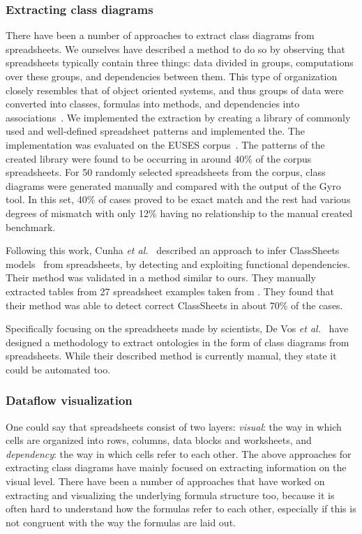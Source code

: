 \documentclass[conference]{IEEEtran}
\begin{document}
\subsubsection{Extracting class diagrams}
There have been a number of approaches to extract class diagrams from spreadsheets. We ourselves have described a method to do so by observing that spreadsheets typically contain three things: data divided in groups, computations over these groups, and dependencies between them. This type of organization closely resembles that of object oriented systems, and thus groups of data were converted into classes, formulas into methods, and dependencies into associations~\cite{hermans_automatically_2010}. We implemented the extraction by creating a library of commonly used and well-defined spreadsheet patterns and implemented the. The implementation was evaluated on the EUSES corpus~\cite{fisher_euses_2005}. The patterns of the created library were found to be occurring in around 40\% of the corpus spreadsheets. For 50 randomly selected spreadsheets from the corpus, class diagrams were generated manually and compared with the output of the Gyro tool. In this set, 40\% of cases proved to be exact match and the rest had various degrees of mismatch with only 12\% having no relationship to the manual created benchmark.

Following this work, Cunha \emph{et al.}~\cite{cunha_automatically_2010} described an approach to infer ClassSheets models~\cite{engels_classsheets:_2005} from spreadsheets, by detecting and exploiting functional dependencies. Their method was validated in a method similar to ours. They manually extracted tables from 27 spreadsheet examples taken from \cite{management_2003}. They found that their method was able to detect correct ClassSheets in about 70\% of the cases.

Specifically focusing on the spreadsheets made by scientists, De Vos \emph{et al.}~\cite{vos_g.:_2012} have designed a methodology to extract ontologies in the form of class diagrams from spreadsheets. While their described method is currently manual, they state it could be automated too. 


\subsubsection{Dataflow visualization}
One could say that spreadsheets consist of two layers: \emph{visual}: the way in which cells are organized into rows, columns, data blocks and worksheets, and \emph{dependency}: the way in which cells refer to each other. The above approaches for extracting class diagrams have mainly focused on extracting information on the visual level. There have been a number of approaches that have worked on extracting and visualizing the underlying formula structure too, because it is often hard to understand how the formulas refer to each other, especially if this is not congruent with the way the formulas are laid out. 
\end{document}
